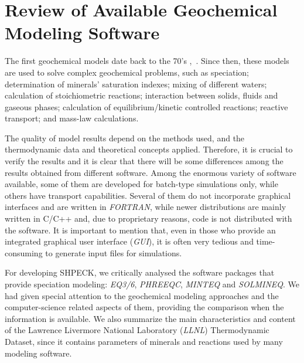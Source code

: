 

\chapter{Review of Available Geochemical Modeling Software}
\label{chapter:review}
The first geochemical models date back to the 70’s \cite{Westall:76},~\cite{Wolery:1979}. 
Since then, these models are used to solve complex geochemical problems, such as speciation; determination of minerals' saturation indexes; mixing of different waters; calculation of stoichiometric reactions; interaction between solids, fluids and gaseous phases; calculation of equilibrium/kinetic controlled reactions; reactive transport; and mass-law calculations.

The quality of model results depend on the methods used, and the thermodynamic data and theoretical concepts applied. Therefore, it is crucial to verify the results and it is clear that there will be some differences among the results obtained from different software. Among the enormous variety of software available, some of them are developed for batch-type simulations only, while others have transport capabilities. Several of them do not incorporate graphical interfaces and are written in \emph{FORTRAN}, while newer distributions are mainly written in C/C++ and, due to proprietary reasons, code is not distributed with the software. It is important to mention that, even in those who provide an integrated graphical user interface (\emph{GUI}), it is often very tedious and time-consuming to generate input files for simulations.


For developing SHPECK, we critically analysed the software packages that provide speciation modeling: \emph{EQ3/6}, \emph{PHREEQC}, \emph{MINTEQ} and \emph{SOLMINEQ}. We had given special attention to the geochemical modeling approaches and the computer-science related aspects of them, providing the comparison when the information is available. We also summarize the main characteristics and content of the Lawrence Livermore National Laboratory (\emph{LLNL}) Thermodynamic Dataset, since it contains parameters of minerals and reactions used by many modeling software.



